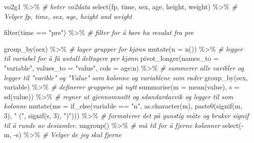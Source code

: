 \documentclass[
]{article}
\newenvironment{Shaded}{\begin{snugshade}}{\end{snugshade}}
\newcommand{\AttributeTok}[1]{\textcolor[rgb]{0.77,0.63,0.00}{#1}}
\newcommand{\CommentTok}[1]{\textcolor[rgb]{0.56,0.35,0.01}{\textit{#1}}}
\newcommand{\DecValTok}[1]{\textcolor[rgb]{0.00,0.00,0.81}{#1}}
\newcommand{\FunctionTok}[1]{\textcolor[rgb]{0.00,0.00,0.00}{#1}}
\newcommand{\NormalTok}[1]{#1}
\newcommand{\SpecialCharTok}[1]{\textcolor[rgb]{0.00,0.00,0.00}{#1}}
\newcommand{\StringTok}[1]{\textcolor[rgb]{0.31,0.60,0.02}{#1}}
\begin{document}
\begin{Shaded}
\begin{Highlighting}[]
\NormalTok{vo2g1 }\SpecialCharTok{\%\textgreater{}\%} \CommentTok{\# heter vo2data}
  \FunctionTok{select}\NormalTok{(fp, time, sex, age, height, weight) }\SpecialCharTok{\%\textgreater{}\%} 
  \CommentTok{\# Velger fp, time, sex, age, height and weight}
  
  \FunctionTok{filter}\NormalTok{(time }\SpecialCharTok{==} \StringTok{"pre"}\NormalTok{) }\SpecialCharTok{\%\textgreater{}\%} \CommentTok{\# filter for å bare ha resulat fra pre}
  
  \FunctionTok{group\_by}\NormalTok{(sex) }\SpecialCharTok{\%\textgreater{}\%} \CommentTok{\# lager grupper for kjønn}
  \FunctionTok{mutate}\NormalTok{(}\AttributeTok{n =} \FunctionTok{n}\NormalTok{()) }\SpecialCharTok{\%\textgreater{}\%} \CommentTok{\# legger til variabel for å få antall deltagere per kjønn}
   \FunctionTok{pivot\_longer}\NormalTok{(}\AttributeTok{names\_to =} \StringTok{"variable"}\NormalTok{, }
               \AttributeTok{values\_to =} \StringTok{"value"}\NormalTok{, }
               \AttributeTok{cols =}\NormalTok{ age}\SpecialCharTok{:}\NormalTok{n) }\SpecialCharTok{\%\textgreater{}\%} \CommentTok{\# summerer alle varibler og legger til "varible" og "Value" som kolonne og variablene som rader}
   \FunctionTok{group\_by}\NormalTok{(sex, variable) }\SpecialCharTok{\%\textgreater{}\%} \CommentTok{\# definerer gruppene på nytt }
  \FunctionTok{summarise}\NormalTok{(}\AttributeTok{m =} \FunctionTok{mean}\NormalTok{(value), }
            \AttributeTok{s =} \FunctionTok{sd}\NormalTok{(value)) }\SpecialCharTok{\%\textgreater{}\%} \CommentTok{\# regner ut gjennomnsitt og sdandardavvik og legger til som kolonne}
  \FunctionTok{mutate}\NormalTok{(}\AttributeTok{ms =} \FunctionTok{if\_else}\NormalTok{(variable }\SpecialCharTok{==} \StringTok{"n"}\NormalTok{, }\FunctionTok{as.character}\NormalTok{(m), }\FunctionTok{paste0}\NormalTok{(}\FunctionTok{signif}\NormalTok{(m, }\DecValTok{3}\NormalTok{),  }\StringTok{" ("}\NormalTok{, }\FunctionTok{signif}\NormalTok{(s, }\DecValTok{3}\NormalTok{), }\StringTok{")"}\NormalTok{))) }\SpecialCharTok{\%\textgreater{}\%} \CommentTok{\# formaterer det på gunstig måte og bruker signif til å runde av desiamler.}
   \FunctionTok{ungroup}\NormalTok{() }\SpecialCharTok{\%\textgreater{}\%} \CommentTok{\# må til for å fjerne kolonner}
  \FunctionTok{select}\NormalTok{(}\SpecialCharTok{{-}}\NormalTok{m, }\SpecialCharTok{{-}}\NormalTok{s) }\SpecialCharTok{\%\textgreater{}\%} \CommentTok{\# Velger de jeg skal fjerne}

\end{Highlighting}
\end{Shaded}
\end{document}
